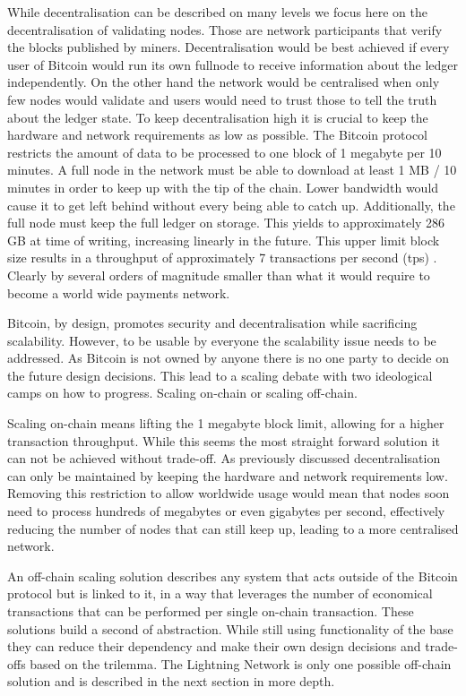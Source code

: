 \documentclass[final]{fhnwreport}       %
\begin{document}
While decentralisation can be described on many levels we focus here on the decentralisation of validating nodes. Those are network participants that verify the blocks published by miners. Decentralisation would be best achieved if  every user of Bitcoin would run its own \gls{fullnode} to receive information about the ledger independently. On the other hand the network would be centralised when only few nodes would validate and users would need to trust those to tell the truth about the ledger state. To keep decentralisation high it is crucial to keep the hardware and network requirements as low as possible. The Bitcoin protocol restricts the amount of data to be processed to one block of 1 megabyte per 10 minutes. A full node in the network must be able to download at least 1 MB / 10 minutes in order to keep up with the tip of the chain. Lower bandwidth would cause it to get left behind without every being able to catch up. Additionally, the full node must keep the full ledger on storage. This yields to approximately 286 GB \cite{noauthor_blocks-size_nodate} at time of writing, increasing linearly in the future. This upper limit block size results in a throughput of approximately 7 transactions per second (tps) \cite{poon_bitcoin_2016}. Clearly by several orders of magnitude smaller than what it would require to become a world wide payments network. 

Bitcoin, by design, promotes security and decentralisation while sacrificing scalability. However, to be usable by everyone the scalability issue needs to be addressed. As Bitcoin is not owned by anyone there is no one party to decide on the future design decisions. This lead to a scaling debate with two ideological camps on how to progress. Scaling on-chain or scaling off-chain.

Scaling on-chain means lifting the 1 megabyte block limit, allowing for a higher transaction throughput. While this seems the most straight forward solution it can not be achieved without trade-off. As previously discussed decentralisation can only be maintained by keeping the hardware and network requirements low. Removing this restriction to allow worldwide usage would mean that nodes soon need to process hundreds of megabytes or even gigabytes per second, effectively reducing the number of nodes that can still keep up, leading to a more centralised network. 

An off-chain scaling solution describes any system that acts outside of the Bitcoin protocol but is linked to it, in a way that leverages the number of economical transactions that can be performed per single on-chain transaction. These solutions build a \gls{second} of abstraction. While still using functionality of the \gls{base} they can reduce their dependency and make their own design decisions and trade-offs based on the \gls{trilemma}. The Lightning Network is only one possible off-chain solution and is described in the next section in more depth. 
\end{document}
